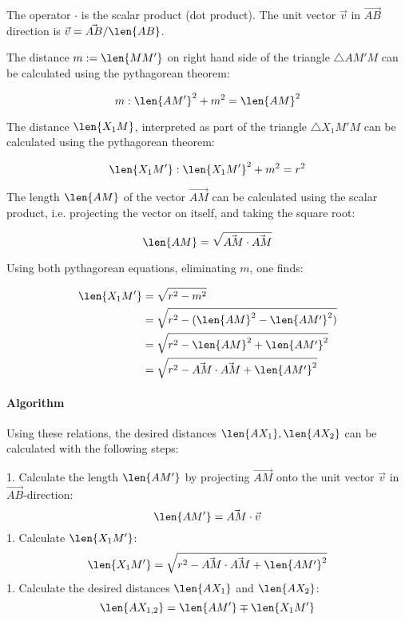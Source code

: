 The operator $\cdot$ is the scalar product (dot product). The unit vector $\vec{v}$ in $\vec{AB}$ direction is $\vec{v} = \vec{AB} / \len{AB}$.

The distance $m:=\len{MM'}$ on right hand side of the triangle $\triangle AM'M$ can be calculated using the pythagorean theorem:

\begin{equation} m: \len{AM'}^2 + m^2 = \len{AM}^2 \end{equation}

The distance $\len{X_1 M}$, interpreted as part of the triangle $\triangle X_1 M' M$ can be calculated using the pythagorean theorem:

\begin{equation} \len{X_1 M'}: \len{X_1 M'}^2 + m^2 = r^2 \end{equation}

The length $\len{AM}$ of the vector $\vec{AM}$ can be calculated using the scalar product, i.e. projecting the vector on itself, and taking the square root:

\begin{equation} \len{AM} = \sqrt{\vec{AM} \cdot \vec{AM}} \end{equation}

Using both pythagorean equations, eliminating $m$, one finds:

\begin{equation}\begin{split}
  \len{X_1 M'} &= \sqrt{r^2 - m^2} \\
    &= \sqrt{r^2 - (\len{AM}^2 - \len{AM'}^2)} \\
    &= \sqrt{r^2 - \len{AM}^2 + \len{AM'}^2} \\
    &= \sqrt{r^2 - \vec{AM} \cdot \vec{AM} + \len{AM'}^2}
\end{split}\end{equation}

\paragraph{Algorithm} Using these relations, the desired distances $\len{AX_1}, \len{AX_2}$ can be calculated with the following steps:

1. Calculate the length $\len{AM'}$ by projecting $\vec{AM}$ onto the unit vector $\vec{v}$ in $\vec{AB}$-direction: $$ \len{AM'} = \vec{AM} \cdot \vec{v} $$
1. Calculate $\len{X_1M'}$: $$ \len{X_1 M'} = \sqrt{r^2 - \vec{AM} \cdot \vec{AM} + \len{AM'}^2} $$
1. Calculate the desired distances $\len{AX_1}$ and $\len{AX_2}$: $$ \len{A X_{1,2}} = \len{A M'} \mp \len{X_1 M'} $$

